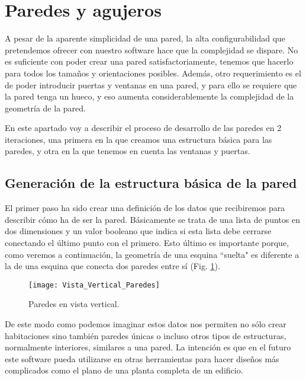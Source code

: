 \section{Paredes y agujeros}
A pesar de la aparente simplicidad de una pared, la alta configurabilidad que pretendemos ofrecer con nuestro software hace que la complejidad se dispare. No es suficiente con poder crear una pared satisfactoriamente, tenemos que hacerlo para todos los tamaños y orientaciones posibles. Además, otro requerimiento es el de poder introducir puertas y ventanas en una pared, y para ello se requiere que la pared tenga un hueco, y eso aumenta considerablemente la complejidad de la geometría de la pared.

En este apartado voy a describir el proceso de desarrollo de las paredes en 2 iteraciones, una primera en la que creamos una estructura básica para las paredes, y otra en la que tenemos en cuenta las ventanas y puertas.

\subsection{Generación de la estructura básica de la pared}
\label{subsec:gen1}
El primer paso ha sido crear una definición de los datos que recibiremos para describir cómo ha de ser la pared. Básicamente se trata de una lista de puntos en dos dimensiones y un valor booleano que indica si esta lista debe cerrarse conectando el último punto con el primero. Esto último es importante porque, como veremos a continuación, la geometría de una esquina ``suelta" es diferente a la de una esquina que conecta dos paredes entre sí (Fig. \ref{fig:vertical_view_walls}).

\begin{figure}[h]
    \centering
    \texttt{[image: Vista\_Vertical\_Paredes]}
    \caption{Paredes en vista vertical.}
    \label{fig:vertical_view_walls}
\end{figure}

De este modo como podemos imaginar estos datos nos permiten no sólo crear habitaciones sino también paredes únicas o incluso otros tipos de estructuras, normalmente interiores, similares a una pared. La intención es que en el futuro este software pueda utilizarse en otras herramientas para hacer diseños más complicados como el plano de una planta completa de un edificio.


